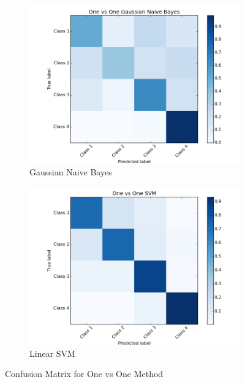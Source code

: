 \documentclass[11pt]{article}
\begin{document}
\begin{figure}[H]
	
	\begin{subfigure}[b]{0.5\textwidth}
		\includegraphics[width=\textwidth]{ovo_gnb.png}
		\caption{Gaussian Naive Bayes}
	\end{subfigure}
	\begin{subfigure}[b]{0.5\textwidth}
		\includegraphics[width=\textwidth]{ovo_svm.png}
		\caption{Linear SVM}
	\end{subfigure}
	\caption{Confusion Matrix for One vs One Method}
	\label{fig:cm_ovo}
\end{figure}
\end{document}
